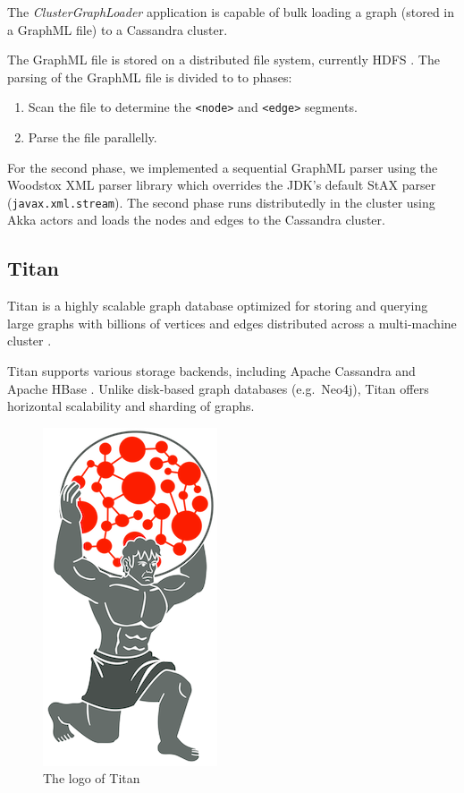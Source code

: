 The \textit{ClusterGraphLoader} application is capable of bulk loading a graph (stored in a GraphML file) to a Cassandra cluster.

The GraphML file is stored on a distributed file system, currently HDFS \cite{hadoop}. The parsing of the GraphML file is divided to to phases:

\begin{enumerate}
  \item Scan the file to determine the \texttt{<node>} and \texttt{<edge>} segments.
  \item Parse the file parallelly.
\end{enumerate}

For the second phase, we implemented a sequential GraphML parser using the Woodstox XML parser library \cite{Woodstox} which overrides the JDK's default StAX parser (\texttt{javax.xml.stream}). The second phase runs distributedly in the cluster using Akka actors and loads the nodes and edges to the Cassandra cluster. 

\subsection{Titan}

Titan is a highly scalable graph database optimized for storing and querying large graphs with billions of vertices and edges distributed across a multi-machine cluster \cite{Titan, TitanRiseOfBigData, TitanCassandra}.

Titan supports various storage backends, including Apache Cassandra \cite{Cassandra} and Apache HBase \cite{HBase}. Unlike disk-based graph databases (e.g.\ Neo4j), Titan offers horizontal scalability and sharding of graphs.

\begin{figure}
\begin{center}
\includegraphics[]{figures/titan-logo}
\caption{The logo of Titan}
\label{fig:titan-logo}
\end{center}
\end{figure}

